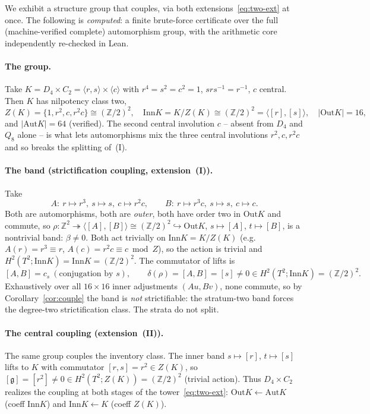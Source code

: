 \documentclass[11pt]{article}
\theoremstyle{definition}
\newcommand{\Z}{\mathbb{Z}}
\newcommand{\Aut}{\mathrm{Aut}}
\newcommand{\Inn}{\mathrm{Inn}}
\newcommand{\Out}{\mathrm{Out}}
\newcommand{\gerbe}{\mathfrak{g}}
\newcommand{\gp}[1]{\langle #1\rangle}
\begin{document}
We exhibit a structure group that couples, via both extensions~\eqref{eq:two-ext} at once. The
following is \emph{computed}: a finite brute-force certificate over the full (machine-verified
complete) automorphism group, with the arithmetic core independently re-checked in Lean.

\paragraph{The group.} Take $K=D_4\times C_2=\gp{r,s}\times\gp{c}$ with
$r^4=s^2=c^2=1$, $srs^{-1}=r^{-1}$, $c$ central. Then $K$ has nilpotency class two,
\[
Z(K)=\{1,r^2,c,r^2c\}\cong(\Z/2)^2,\quad \Inn K=K/Z(K)\cong(\Z/2)^2=\gp{[r],[s]},\quad|\Out K|=16,
\]
and $|\Aut K|=64$ (verified). The second central involution $c$ -- absent from $D_4$ and $Q_8$
alone -- is what lets automorphisms mix the three central involutions $r^2,c,r^2c$ and so breaks
the splitting of~(I).

\paragraph{The band (strictification coupling, extension~(I)).} Take
\[
A\colon\ r\mapsto r^3,\ s\mapsto s,\ c\mapsto r^2c,
\qquad
B\colon\ r\mapsto r^3c,\ s\mapsto s,\ c\mapsto c.
\]
Both are automorphisms, both are \emph{outer}, both have order two in $\Out K$ and commute, so
$\rho\colon\Z^2\twoheadrightarrow\gp{[A],[B]}\cong(\Z/2)^2\hookrightarrow\Out K$,
$s\mapsto[A]$, $t\mapsto[B]$, is a nontrivial band: $\beta\neq0$. Both act trivially on
$\Inn K=K/Z(K)$ (e.g.\ $A(r)=r^3\equiv r$, $A(c)=r^2c\equiv c\bmod Z$), so the action is trivial
and $H^2(T^2;\Inn K)=\Inn K=(\Z/2)^2$. The commutator of lifts is
\[
[A,B]=c_s\ (\text{conjugation by }s),\qquad
\delta(\rho)=[A,B]=[s]\neq0\in H^2(T^2;\Inn K)=(\Z/2)^2.
\]
Exhaustively over all $16\times16$ inner adjustments $(Au,Bv)$, none commute, so by
Corollary~\ref{cor:couple} the band is \emph{not} strictifiable: the stratum-two band forces the
degree-two strictification class. The strata do not split.

\paragraph{The central coupling (extension~(II)).} The same group couples the inventory class.
The inner band $s\mapsto[r]$, $t\mapsto[s]$ lifts to $K$ with commutator $[r,s]=r^2\in Z(K)$, so
$[\gerbe]=[r^2]\neq0\in H^2(T^2;Z(K))=(\Z/2)^2$ (trivial action). Thus $D_4\times C_2$ realizes
the coupling at both stages of the tower~\eqref{eq:two-ext}: $\Out K\!\leftarrow\!\Aut K$ (coeff
$\Inn K$) and $\Inn K\!\leftarrow\!K$ (coeff $Z(K)$).
\end{document}
